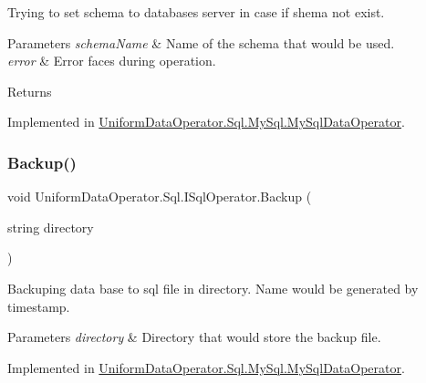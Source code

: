 Trying to set schema to databases server in case if shema not exist. 


\begin{DoxyParams}{Parameters}
{\em schema\+Name} & Name of the schema that would be used.\\
\hline
{\em error} & Error faces during operation.\\
\hline
\end{DoxyParams}
\begin{DoxyReturn}{Returns}

\end{DoxyReturn}


Implemented in \mbox{\hyperlink{class_uniform_data_operator_1_1_sql_1_1_my_sql_1_1_my_sql_data_operator_a2ed7d06bc016ae6d07cbcceffc21bbd3}{Uniform\+Data\+Operator.\+Sql.\+My\+Sql.\+My\+Sql\+Data\+Operator}}.

\mbox{\label{interface_uniform_data_operator_1_1_sql_1_1_i_sql_operator_a096be4f746c1fcbb8b2894c2517b937c}} 
\subsubsection{\texorpdfstring{Backup()}{Backup()}}
{\footnotesize\ttfamily void Uniform\+Data\+Operator.\+Sql.\+I\+Sql\+Operator.\+Backup (\begin{DoxyParamCaption}\item[{string}]{directory }\end{DoxyParamCaption})}



Backuping data base to sql file in directory. Name would be generated by timestamp. 


\begin{DoxyParams}{Parameters}
{\em directory} & Directory that would store the backup file.\\
\hline
\end{DoxyParams}


Implemented in \mbox{\hyperlink{class_uniform_data_operator_1_1_sql_1_1_my_sql_1_1_my_sql_data_operator_a0dbd58206733a17dd26143b58d0859d7}{Uniform\+Data\+Operator.\+Sql.\+My\+Sql.\+My\+Sql\+Data\+Operator}}.

